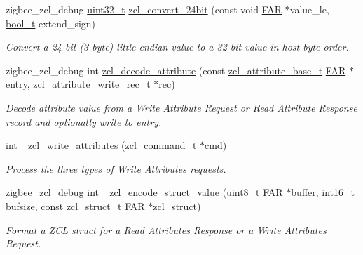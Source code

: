 \begin{DoxyCompactItemize}
zigbee\-\_\-zcl\-\_\-debug \hyperlink{group__hal__dos_ga09a1e304d66d35dd47daffee9731edaa}{uint32\-\_\-t} \hyperlink{group__zcl_ga405e1c70b6278aae3a307971433c9229}{zcl\-\_\-convert\-\_\-24bit} (const void \hyperlink{group__hal_gaef060b3456fdcc093a7210a762d5f2ed}{F\-A\-R} $\ast$value\-\_\-le, \hyperlink{group__hal_ga04dd5074964518403bf944f2b240a5f8}{bool\-\_\-t} extend\-\_\-sign)
\begin{DoxyCompactList}\small\item\em Convert a 24-\/bit (3-\/byte) little-\/endian value to a 32-\/bit value in host byte order. \end{DoxyCompactList}\item 
zigbee\-\_\-zcl\-\_\-debug int \hyperlink{group__zcl_ga15bf36dadccd7a045bad7d6f0842e25a}{zcl\-\_\-decode\-\_\-attribute} (const \hyperlink{structzcl__attribute__base__t}{zcl\-\_\-attribute\-\_\-base\-\_\-t} \hyperlink{group__hal_gaef060b3456fdcc093a7210a762d5f2ed}{F\-A\-R} $\ast$entry, \hyperlink{structzcl__attribute__write__rec__t}{zcl\-\_\-attribute\-\_\-write\-\_\-rec\-\_\-t} $\ast$rec)
\begin{DoxyCompactList}\small\item\em Decode attribute value from a Write Attribute Request or Read Attribute Response record and optionally write to {\ttfamily entry}. \end{DoxyCompactList}\item 
int \hyperlink{group__zcl_gaff3abb5d2022101c2873e7a8e8b027e5}{\-\_\-zcl\-\_\-write\-\_\-attributes} (\hyperlink{structzcl__command__t}{zcl\-\_\-command\-\_\-t} $\ast$cmd)
\begin{DoxyCompactList}\small\item\em Process the three types of Write Attributes requests. \end{DoxyCompactList}\item 
zigbee\-\_\-zcl\-\_\-debug int \hyperlink{group__zcl_ga4387e5f016fb26d1ac43b24f78aa066a}{\-\_\-zcl\-\_\-encode\-\_\-struct\-\_\-value} (\hyperlink{group__hal_gae1affc9ca37cfb624959c866a73f83c2}{uint8\-\_\-t} \hyperlink{group__hal_gaef060b3456fdcc093a7210a762d5f2ed}{F\-A\-R} $\ast$buffer, \hyperlink{group__hal_ga2140805d08462d474b82ddc8d1c2f3e6}{int16\-\_\-t} bufsize, const \hyperlink{structzcl__struct__t}{zcl\-\_\-struct\-\_\-t} \hyperlink{group__hal_gaef060b3456fdcc093a7210a762d5f2ed}{F\-A\-R} $\ast$zcl\-\_\-struct)
\begin{DoxyCompactList}\small\item\em Format a Z\-C\-L struct for a Read Attributes Response or a Write Attributes Request. \end{DoxyCompactList}\item 

\end{DoxyCompactItemize}
